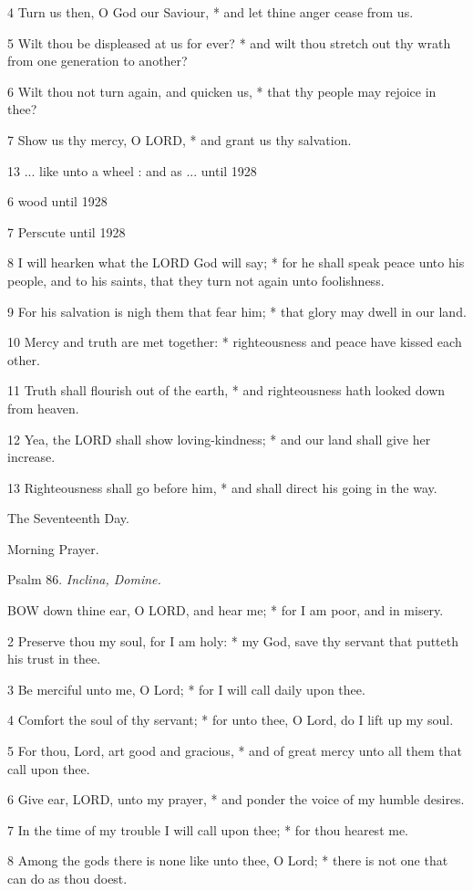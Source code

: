 4 Turn us then, O God our Saviour, * and let thine
anger cease from us.

5 Wilt thou be displeased at us for ever? * and wilt
thou stretch out thy wrath from one generation to another?

6 Wilt thou not turn again, and quicken us, * that
thy people may rejoice in thee?

7 Show us thy mercy, O LORD, * and grant us thy salvation.

13 ... like unto a wheel : and as ...
until
1928 

6 wood
until 1928

7 Perscute
until
1928

8 I will hearken what the LORD God will say; * for he shall speak peace
unto his people, and to his saints, that they turn not again unto foolishness.

9 For his salvation is nigh them that fear him; * that
glory may dwell in our land.

10 Mercy and truth are met together: * righteousness
and peace have kissed each other.

11 Truth shall flourish out of the earth, * and righteousness
hath looked down from heaven.

12 Yea, the LORD shall show loving-kindness; * and
our land shall give her increase.

13 Righteousness shall go before him, * and shall direct
his going in the way. 

The
Seventeenth Day.

Morning
Prayer.

Psalm
86. \emph{Inclina, Domine.}

BOW
down thine ear, O LORD, and hear me; * for I am poor, and in misery.

2 Preserve thou my soul, for I am holy: * my God, save
thy servant that putteth his trust in thee.

3 Be merciful unto me, O Lord; * for I will call daily
upon thee.

4 Comfort the soul of thy servant; * for unto thee,
O Lord, do I lift up my soul.

5 For thou, Lord, art good and gracious, * and of great
mercy unto all them that call upon thee.

6 Give ear, LORD, unto my prayer, * and ponder the
voice of my humble desires.

7 In the time of my trouble I will call upon thee;
* for thou hearest me.

8 Among the gods there is none like unto thee, O Lord;
* there is not one that can do as thou doest.


